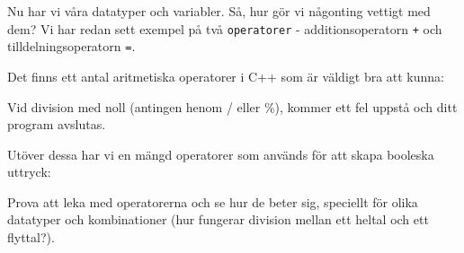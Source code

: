 Nu har vi våra datatyper och variabler. Så, hur gör vi någonting vettigt med dem? Vi har redan sett exempel på två \texttt{operatorer} - additionsoperatorn \texttt{+} och tilldelningsoperatorn \texttt{=}.

Det finns ett antal aritmetiska operatorer i C++ som är väldigt bra att kunna:



Vid division med noll (antingen henom / eller \%), kommer ett fel uppstå och ditt program avslutas.

Utöver dessa har vi en mängd operatorer som används för att skapa booleska uttryck:



Prova att leka med operatorerna och se hur de beter sig, speciellt för olika datatyper och kombinationer (hur fungerar division mellan ett heltal och ett flyttal?).
